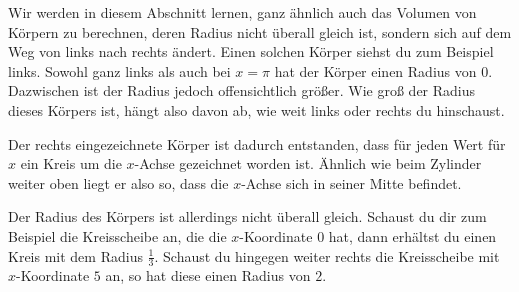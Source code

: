 \documentclass[../../main.tex]{subfiles}
\begin{document}
Wir werden in diesem Abschnitt lernen, ganz ähnlich auch das Volumen von Körpern zu berechnen, deren
Radius nicht überall gleich ist, sondern sich auf dem Weg von links nach rechts ändert. Einen solchen Körper siehst du
zum Beispiel links. Sowohl ganz links als auch bei $x=\pi$ hat der Körper einen Radius von $0$. Dazwischen ist der
Radius jedoch offensichtlich größer.
Wie groß der Radius dieses Körpers ist, hängt also davon ab, wie weit links oder rechts du hinschaust.

\begin{example}{}
    Der rechts eingezeichnete Körper ist dadurch entstanden, dass für jeden Wert für $x$ ein Kreis um die $x$-Achse
    gezeichnet worden ist. Ähnlich wie beim Zylinder weiter oben liegt er also so, dass die $x$-Achse sich in seiner
    Mitte befindet. 
    
    Der Radius des Körpers ist allerdings nicht überall gleich. Schaust du dir zum Beispiel die Kreisscheibe
    an, die die $x$-Koordinate $0$ hat, dann erhältst du einen Kreis mit dem Radius $\frac{1}{3}$. Schaust du hingegen
    weiter rechts die Kreisscheibe mit $x$-Koordinate $5$ an, so hat diese einen Radius von $2$.
    

\end{example}
\end{document}
